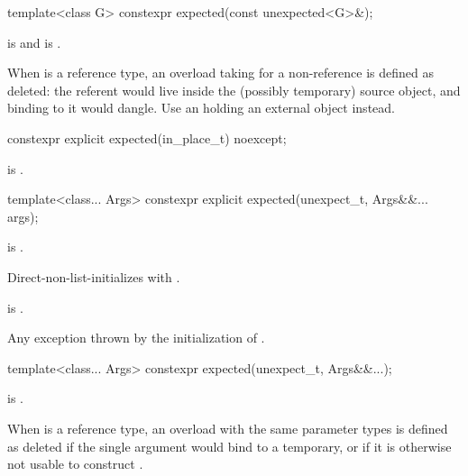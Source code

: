 %
\begin{itemdecl}
template<class G> constexpr expected(const unexpected<G>&);
\end{itemdecl}

\begin{itemdescr}
\pnum
\constraints
{} is  and  is .

\pnum
\remarks
When  is a reference type, an overload taking  for a non-reference  is defined as deleted: the referent would live inside the (possibly temporary) source  object, and binding  to it would dangle. Use an  holding an external object instead.
\end{itemdescr}

%
\begin{itemdecl}
constexpr explicit expected(in_place_t) noexcept;
\end{itemdecl}

\begin{itemdescr}
\pnum
\ensures
{} is .
\end{itemdescr}

%
\begin{itemdecl}
template<class... Args> constexpr explicit expected(unexpect_t, Args&&... args);
\end{itemdecl}

\begin{itemdescr}
\pnum
\constraints
{} is .

\pnum
\effects
Direct-non-list-initializes  with .

\pnum
\ensures
{} is .

\pnum
\throws
Any exception thrown by the initialization of .
\end{itemdescr}

%
\begin{itemdecl}
template<class... Args> constexpr expected(unexpect_t, Args&&...);
\end{itemdecl}

\begin{itemdescr}
\pnum
\constraints
{} is .

\pnum
\remarks
When  is a reference type, an overload with the same parameter types is defined as deleted if the single argument would bind  to a temporary, or if it is otherwise not usable to construct .
\end{itemdescr}

